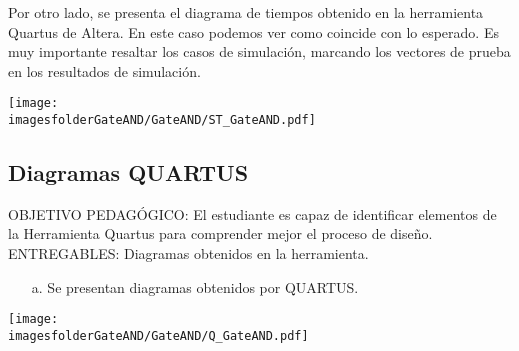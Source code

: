Por otro lado, se presenta el diagrama de tiempos obtenido en la herramienta Quartus de Altera. En este caso podemos ver como coincide con lo esperado. Es muy importante resaltar los casos de simulación, marcando los vectores de prueba en los resultados de simulación.

		\begin{center}
			\texttt{[image: \\imagesfolderGateAND/GateAND/ST\_GateAND.pdf]}%
		\end{center}
\subsection{Diagramas QUARTUS}
\scriptsize
	\begin{tcolorbox}[enhanced,title=PRODUCTO DE CALIDAD:,colframe=colorA1,colback=colorA2,arc=0mm,colbacktitle=white,fonttitle=\bfseries,coltitle=white,attach boxed title to top left={xshift=3.2mm,yshift=-0.50mm},boxed title style={skin=enhancedfirst jigsaw,size=small,arc=0mm,bottom=1mm,interior style={fill=none,top color=color2,bottom color=color2},,boxrule=0pt},boxrule=0pt]
		OBJETIVO PEDAGÓGICO: El estudiante es capaz de identificar elementos de la Herramienta Quartus para comprender mejor el proceso de diseño.\\
		ENTREGABLES: Diagramas obtenidos en la herramienta.
		\begin{enumerate}
			\item[a.] Se presentan diagramas obtenidos por QUARTUS.
		\end{enumerate}
	\end{tcolorbox}

\normalsize

		\begin{center}
			\texttt{[image: \\imagesfolderGateAND/GateAND/Q\_GateAND.pdf]}%
		\end{center}
